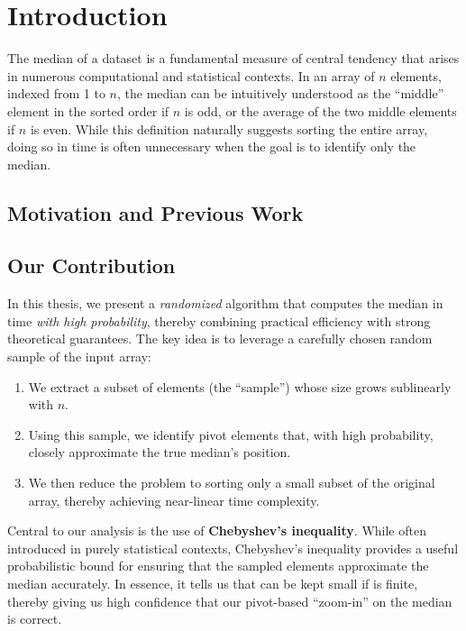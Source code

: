 
\chapter{Introduction}\label{ch:paper_introduction}

The median of a dataset is a fundamental measure of central tendency that arises in numerous computational and statistical contexts. In an array of \(n\) elements, indexed from 1 to \(n\), the median can be intuitively understood as the “middle” element in the sorted order if \(n\) is odd, or the average of the two middle elements if \(n\) is even. While this definition naturally suggests sorting the entire array, doing so in  time is often unnecessary when the goal is to identify only the median.

\section*{Motivation and Previous Work}

\section*{Our Contribution}

In this thesis, we present a \emph{randomized} algorithm that computes the median in  time \emph{with high probability}, thereby combining practical efficiency with strong theoretical guarantees. The key idea is to leverage a carefully chosen random sample of the input array:
\begin{enumerate}
    \item We extract a subset of elements (the “sample”) whose size grows sublinearly with \(n\).
    \item Using this sample, we identify pivot elements that, with high probability, closely approximate the true median's position.
    \item We then reduce the problem to sorting only a small subset of the original array, thereby achieving near-linear time complexity.
\end{enumerate}

Central to our analysis is the use of \textbf{Chebyshev’s inequality}. While often introduced in purely statistical contexts, Chebyshev’s inequality provides a useful probabilistic bound for ensuring that the sampled elements approximate the median accurately. In essence, it tells us that  can be kept small if  is finite, thereby giving us high confidence that our pivot-based “zoom-in” on the median is correct.

